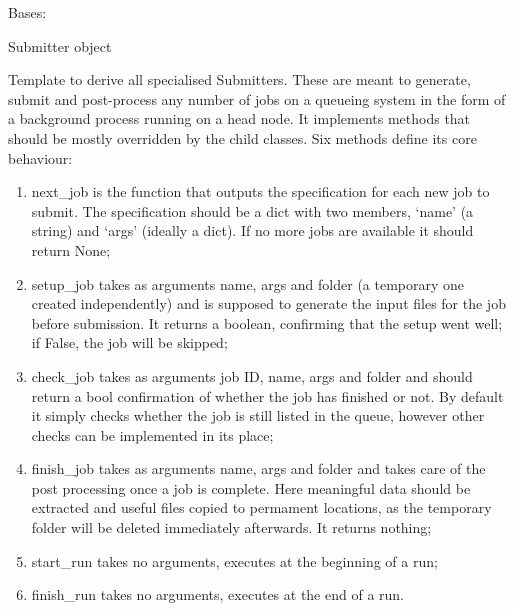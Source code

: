 \documentclass[letterpaper,10pt,english]{sphinxmanual}
\begin{document}
\begin{fulllineitems}
\label{doctree/soprano.hpc.submitter.submit:soprano.hpc.submitter.submit.Submitter}
Bases: 

Submitter object

Template to derive all specialised Submitters. These are meant to generate,
submit and post-process any number of jobs on a queueing system in the form
of a background process running on a head node. It implements
methods that should be mostly overridden by the child classes.
Six methods define its core behaviour:
\begin{enumerate}
\item {} 
next\_job is the function that outputs the specification for each new job
to submit. The specification should be a dict with two members, `name'
(a string) and `args' (ideally a dict). If no more jobs are available
it should return None;

\item {} 
setup\_job takes as arguments name, args and folder (a temporary one
created independently) and is supposed to generate the input files
for the job before submission. It returns a boolean, confirming that
the setup went well; if False, the job will be skipped;

\item {} 
check\_job takes as arguments job ID, name, args and folder and should
return a bool confirmation of whether the job has finished or not. By
default it simply checks whether the job is still listed in the queue,
however other checks can be implemented in its place;

\item {} 
finish\_job takes as arguments name, args and folder and takes care of
the post processing once a job is complete. Here meaningful data should
be extracted and useful files copied to permament locations, as the
temporary folder will be deleted immediately afterwards. It returns
nothing;

\item {} 
start\_run takes no arguments, executes at the beginning of a run;

\item {} 
finish\_run takes no arguments, executes at the end of a run.


\end{enumerate}
\end{fulllineitems}
\end{document}
